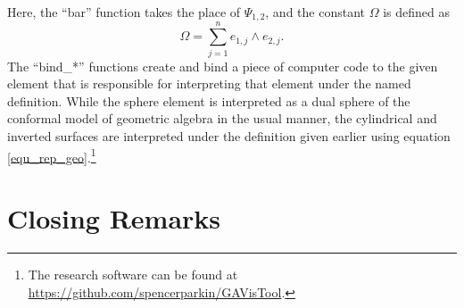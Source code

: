 \documentclass{ecgd-l}
\theoremstyle{definition}
\theoremstyle{remark}
\numberwithin{equation}{section}
\begin{document}
Here, the ``bar'' function takes the place of $\Psi_{1,2}$, and
the constant $\Omega$ is defined as
\begin{equation*}
\Omega = \sum_{j=1}^n e_{1,j}\wedge e_{2,j}.
\end{equation*}
The ``bind\_*'' functions create and bind a piece of computer code
to the given element that is responsible
for interpreting that element under the named definition.
While the sphere element is interpreted as a dual sphere of the conformal model
of geometric algebra in the usual manner, the cylindrical and inverted
surfaces are interpreted under the definition given earlier using
equation \eqref{equ_rep_geo}.\footnote{The research software
can be found at \url{https://github.com/spencerparkin/GAVisTool}.}

\section{Closing Remarks}



\end{document}
